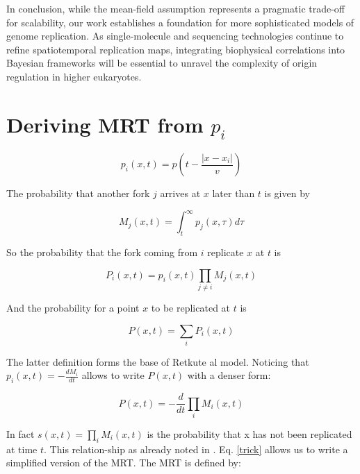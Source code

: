 \documentclass[10pt,a4paper]{revtex4-2}
\begin{document}
In conclusion, while the mean-field assumption represents a pragmatic trade-off for scalability, 
our work establishes a foundation for more sophisticated models of genome replication. 
As single-molecule and sequencing technologies continue to refine spatiotemporal replication maps, 
integrating biophysical correlations into Bayesian frameworks will be essential to unravel the 
complexity of origin regulation in higher eukaryotes.


 


\appendix


\section{Deriving MRT from $p_i$}\label{seq:MRT}

\begin{equation}
p_i(x,t) =  p \left(t-\frac{|x-x_i|}{v}\right) 
\end{equation} 

The probability that another fork $j$ arrives at $x$ later than $t$  is given by

\begin{equation}
M_j(x,t) = \int_t^{\infty} p_j(x,\tau) d\tau
\end{equation} 

So the probability that the fork coming from $i$ replicate $x$ at $t$ is

\begin{equation}
P_i(x,t) = p_i(x,t)\prod_{j \neq i} M_j(x,t)
\end{equation}

And the probability for a point $x$ to be replicated at $t$ is 

\begin{equation}\label{op}
P(x,t) = \sum_i P_i(x,t)
\end{equation}

The latter definition forms the base of Retkute al \cite{Retkute2012} model.
Noticing that $p_i(x,t) = -\frac{dM_i}{dt}$ allows to write $P(x,t)$ with a denser form:

\begin{equation}\label{trick}
P(x,t) = -\frac{ d }{dt} \prod_{i} M_i(x,t)
\end{equation}

In fact $s(x,t)=\prod_{i} M_i(x,t)$ is the probability that x has not been replicated at time $t$. This relation-ship as already noted in \cite{Baker2014}. Eq. \eqref{trick} allows us to write a simplified version of the MRT. The MRT is defined by:
\end{document}

